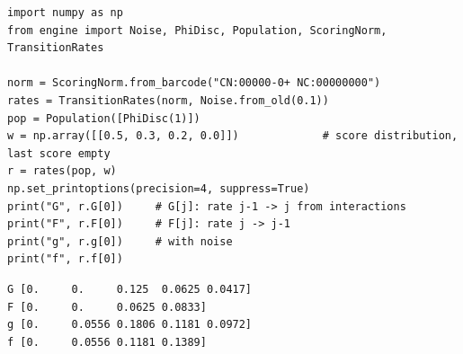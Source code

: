 \begin{lstlisting}[style=code]
import numpy as np
from engine import Noise, PhiDisc, Population, ScoringNorm, TransitionRates

norm = ScoringNorm.from_barcode("CN:00000-0+ NC:00000000")
rates = TransitionRates(norm, Noise.from_old(0.1))
pop = Population([PhiDisc(1)])
w = np.array([[0.5, 0.3, 0.2, 0.0]])             # score distribution, last score empty
r = rates(pop, w)
np.set_printoptions(precision=4, suppress=True)
print("G", r.G[0])     # G[j]: rate j-1 -> j from interactions
print("F", r.F[0])     # F[j]: rate j -> j-1
print("g", r.g[0])     # with noise
print("f", r.f[0])
\end{lstlisting}
\begin{lstlisting}[style=output]
G [0.     0.     0.125  0.0625 0.0417]
F [0.     0.     0.0625 0.0833]
g [0.     0.0556 0.1806 0.1181 0.0972]
f [0.     0.0556 0.1181 0.1389]
\end{lstlisting}
